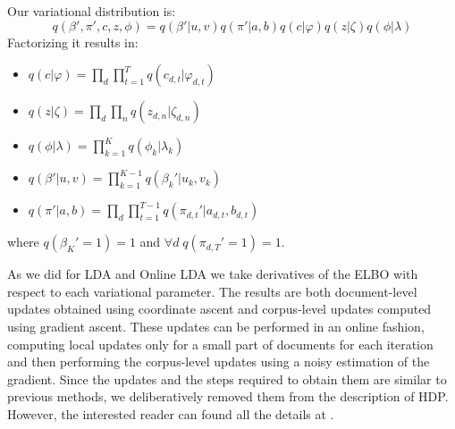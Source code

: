 Our variational distribution is:
\begin{equation*}
    q(\beta', \pi', c, z, \phi) = q(\beta' | u, v) q(\pi' | a, b) q(c | \varphi) q(z | \zeta) q(\phi | \lambda)
\end{equation*}
Factorizing it results in:
\begin{itemize}
    \item $q(c | \varphi) = \prod_d \prod_{t=1}^T q(c_{d,t} | \varphi_{d,t})$
    \item $q(z | \zeta) = \prod_d \prod_n q(z_{d,n} | \zeta_{d,n})$
    \item $q(\phi | \lambda) = \prod_{k=1}^{K} q(\phi_k | \lambda_k)$
    \item $q(\beta' | u, v) = \prod_{k=1}^{K-1} q(\beta_k' | u_k, v_k)$
    \item $q(\pi' | a, b) = \prod_d \prod_{t=1}^{T-1} q(\pi_{d,t}' | a_{d,t}, b_{d,t})$
\end{itemize}
where $q(\beta_K' = 1) = 1$ and $\forall d \; q(\pi_{d,T}' = 1) = 1$.

As we did for LDA and Online LDA we take derivatives of the ELBO
with respect to each variational parameter.
The results are both document-level updates obtained using coordinate ascent
and corpus-level updates computed using gradient ascent.
These updates can be performed in an online fashion,
computing local updates only for a small part of documents
for each iteration and then performing the corpus-level updates using a noisy estimation
of the gradient.
Since the updates and the steps required to obtain them are similar to previous methods,
we deliberatively removed them from the description of HDP. However, the interested reader can
found all the details at \cite{DBLP:journals/jmlr/WangPB11}.